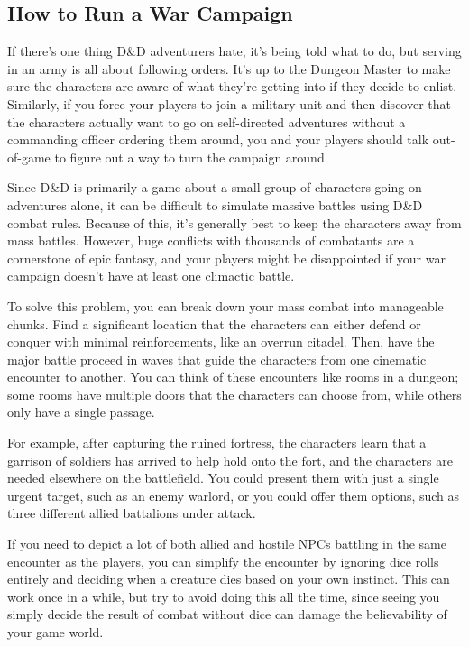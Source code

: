 \documentclass[10pt,a4paper,twoside,bg=print,twocolumn,openany,nodeprecatedcode]{dndbook}
\begin{document}
\subsection{How to Run a War Campaign}
If there's one thing D\&D adventurers hate, it's being told what to do, but serving in an army is all about following orders. It's up to the Dungeon Master to make sure the characters are aware of what they're getting into if they decide to enlist. Similarly, if you force your players to join a military unit and then discover that the characters actually want to go on self-directed adventures without a commanding officer ordering them around, you and your players should talk out-of-game to figure out a way to turn the campaign around.

Since D\&D is primarily a game about a small group of characters going on adventures alone, it can be difficult to simulate massive battles using D\&D combat rules. Because of this, it's generally best to keep the characters away from mass battles. However, huge conflicts with thousands of combatants are a cornerstone of epic fantasy, and your players might be disappointed if your war campaign doesn't have at least one climactic battle.

To solve this problem, you can break down your mass combat into manageable chunks. Find a significant location that the characters can either defend or conquer with minimal reinforcements, like an overrun citadel. Then, have the major battle proceed in waves that guide the characters from one cinematic encounter to another. You can think of these encounters like rooms in a dungeon; some rooms have multiple doors that the characters can choose from, while others only have a single passage.

For example, after capturing the ruined fortress, the characters learn that a garrison of soldiers has arrived to help hold onto the fort, and the characters are needed elsewhere on the battlefield. You could present them with just a single urgent target, such as an enemy warlord, or you could offer them options, such as three different allied battalions under attack.

If you need to depict a lot of both allied and hostile NPCs battling in the same encounter as the players, you can simplify the encounter by ignoring dice rolls entirely and deciding when a creature dies based on your own instinct. This can work once in a while, but try to avoid doing this all the time, since seeing you simply decide the result of combat without dice can damage the believability of your game world.
\end{document}
